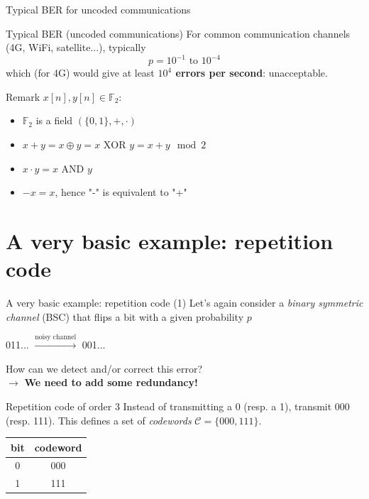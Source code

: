 \documentclass[10pt]{beamer}
\newcommand{\gf}{\mathbb{F}_2}
\begin{document}
\begin{frame}{Typical BER for uncoded communications}
    \begin{exampleblock}{Typical BER (uncoded communications)}
    For common communication channels (4G, WiFi, satellite...), typically
    \[ p = 10^{-1} \text{ to } 10^{-4} \]
    which (for 4G) would give at least \textbf{$10^4$ errors per second}:
    {\color{red}unacceptable}.
    \end{exampleblock}

    \begin{block}{Remark}
        $x[n], y[n] \in \gf$:
        \begin{itemize}
            \item $\gf$ is a field $(\{0, 1\}, +, \cdot)$
            \item $x + y = x \oplus y = x \text{ XOR } y = x + y \mod 2$
            \item $x \cdot y = x \text{ AND } y$
            \item $-x = x$, hence "-" is equivalent to "+"
        \end{itemize}
    \end{block}
\end{frame}

\section{A very basic example: repetition code}
\begin{frame}{A very basic example: repetition code (1)}
    Let's again consider a \textit{binary symmetric channel} (BSC) that flips a bit with a
    given probability $p$
    \begin{center}
        011... $\xrightarrow{\text{noisy channel}}$ 0{\color{red}0}1...
    \end{center}
    How can we detect and/or correct this error? \\
    $\to$ \textbf{We need to add some redundancy!}

    \begin{exampleblock}{Repetition code of order 3}
        Instead of transmitting a 0 (resp. a 1), transmit 000 (resp. 111). This defines a
        set of \textit{codewords} $\mathcal{C} = \{000, 111\}$.

        \begin{center}
            \begin{tabular}{c|c}
                \textbf{bit} & \textbf{codeword} \\
                \hline
                0   & 000 \\
                1   & 111
            \end{tabular}
        \end{center}
    \end{exampleblock}
\end{frame}
\end{document}
